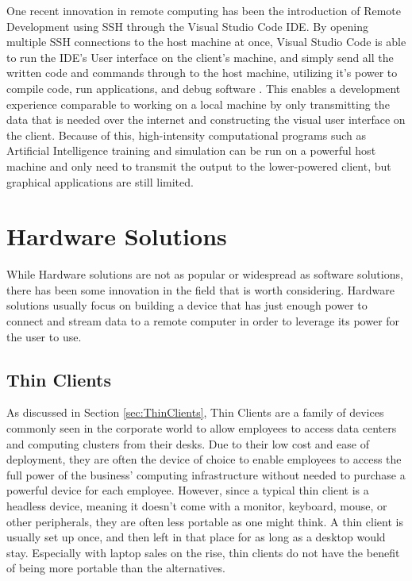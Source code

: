 One recent innovation in remote computing has been the introduction of Remote Development using SSH through the Visual Studio Code IDE.
By opening multiple SSH connections to the host machine at once, Visual Studio Code is able to run the IDE's User interface on the client's machine, and simply send all the written code and commands through to the host machine, utilizing it's power to compile code, run applications, and debug software \cite{vscode_ssh}.
This enables a development experience comparable to working on a local machine by only transmitting the data that is needed over the internet and constructing the visual user interface on the client.
Because of this, high-intensity computational programs such as Artificial Intelligence training and simulation can be run on a powerful host machine and only need to transmit the output to the lower-powered client, but graphical applications are still limited.

\section{Hardware Solutions}\label{sec:HardwareSolutions}

While Hardware solutions are not as popular or widespread as software solutions, there has been some innovation in the field that is worth considering.
Hardware solutions usually focus on building a device that has just enough power to connect and stream data to a remote computer in order to leverage its power for the user to use.


\subsection{Thin Clients}\label{subsec:ThinClients}

As discussed in Section \ref{sec:ThinClients}, Thin Clients are a family of devices commonly seen in the corporate world to allow employees to access data centers and computing clusters from their desks.
Due to their low cost and ease of deployment, they are often the device of choice to enable employees to access the full power of the business' computing infrastructure without needed to purchase a powerful device for each employee.
However, since a typical thin client is a headless device, meaning it doesn't come with a monitor, keyboard, mouse, or other peripherals, they are often less portable as one might think.
A thin client is usually set up once, and then left in that place for as long as a desktop would stay.
Especially with laptop sales on the rise, thin clients do not have the benefit of being more portable than the alternatives.

